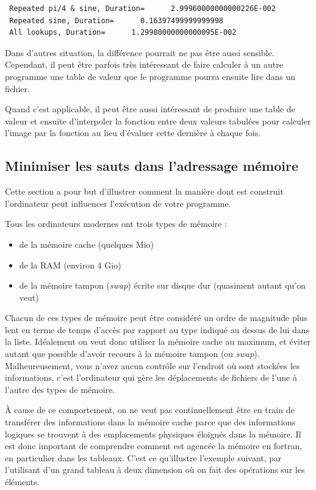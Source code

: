 \documentclass[a4paper,twoside]{article}
\begin{document}
\begin{verbatim}
 Repeated pi/4 & sine, Duration=      2.99960000000000226E-002
 Repeated sine, Duration=      0.16397499999999998     
 All lookups, Duration=      1.29980000000000095E-002
\end{verbatim}

\begin{remarque}
Dans d'autres situation, la différence pourrait ne pas être aussi sensible. Cependant, il peut être parfois très intéressant de faire calculer à un autre programme une table de valeur que le programme pourra ensuite lire dans un fichier.

Quand c'est applicable, il peut être aussi intéressant de produire une table de valeur et ensuite d'interpoler la fonction entre deux valeurs tabulées pour calculer l'image par la fonction au lieu d'évaluer cette dernière à chaque fois.
\end{remarque}

\subsection{Minimiser les sauts dans l'adressage mémoire}\label{sec:indices_loops}
Cette section a pour but d'illustrer comment la manière dont est construit l'ordinateur peut influencer l'exécution de votre programme.

Tous les ordinateurs modernes ont trois types de mémoire :
\begin{itemize}
\item de la mémoire cache (quelques Mio)
\item de la RAM (environ 4 Gio)
\item de la mémoire tampon (\textit{swap}) écrite sur disque dur (quasiment autant qu'on veut)
\end{itemize}
Chacun de ces types de mémoire peut être considéré un ordre de magnitude plus lent en terme de temps d'accès par rapport au type indiqué au dessus de lui dans la liste. Idéalement on veut donc utiliser la mémoire cache au maximum, et éviter autant que possible d'avoir recours à la mémoire tampon (ou \textit{swap}). Malheureusement, vous n'avez aucun contrôle sur l'endroit où sont stockées les informations, c'est l'ordinateur qui gère les déplacements de fichiers de l'une à l'autre des types de mémoire. 

\begin{important}
À cause de ce comportement, on ne veut pas continuellement être en train de transférer des informations dans la mémoire cache parce que des informations logiques se trouvent à des emplacements physiques éloignés dans la mémoire. Il est donc important de comprendre comment est agencée la mémoire en fortran, en particulier dans les tableaux. C'est ce qu'illustre l'exemple suivant, par l'utilisant d'un grand tableau à deux dimension où on fait des opérations sur les éléments.
\end{important}
\end{document}
